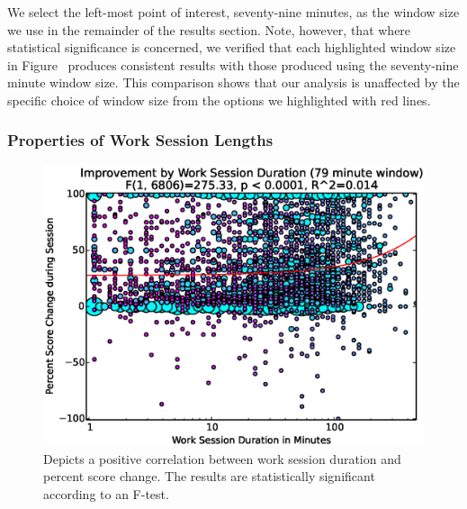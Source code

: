 We select the left-most point of interest, seventy-nine minutes, as the window
size we use in the remainder of the results section. Note, however, that where
statistical significance is concerned, we verified that each highlighted window
size in Figure~ produces consistent results with
those produced using the seventy-nine minute window size. This comparison shows
that our analysis is unaffected by the specific choice of window size from the
options we highlighted with red lines.

\subsubsection{Properties of Work Session Lengths}

\begin{figure}[!t]
\centering \includegraphics[width=5.25in]{graphs/Improvement_by_Work_Session_Duration_(79_minute_window).eps}
\caption{Depicts a positive correlation between work session duration and
  percent score change. The results are statistically significant according to
  an F-test.}
\end{figure}

